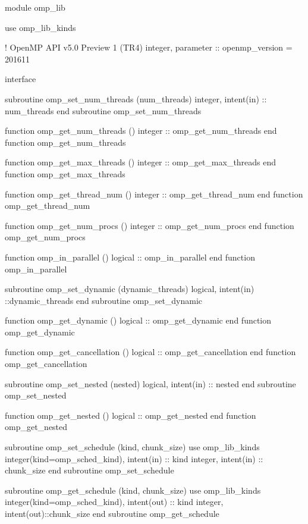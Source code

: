 {\begin{codepar}
        module omp\_lib

          use omp\_lib\_kinds

!                                     OpenMP API v5.0 Preview 1 (TR4)
          integer, parameter :: openmp\_version = 201611

         interface

          subroutine omp\_set\_num\_threads (num\_threads)
           integer, intent(in) :: num\_threads
          end subroutine omp\_set\_num\_threads

          function omp\_get\_num\_threads ()
           integer :: omp\_get\_num\_threads
          end function omp\_get\_num\_threads

          function omp\_get\_max\_threads ()
           integer :: omp\_get\_max\_threads
          end function omp\_get\_max\_threads

          function omp\_get\_thread\_num ()
           integer :: omp\_get\_thread\_num
          end function omp\_get\_thread\_num

          function omp\_get\_num\_procs ()
           integer :: omp\_get\_num\_procs
          end function omp\_get\_num\_procs

          function omp\_in\_parallel ()
           logical :: omp\_in\_parallel
          end function omp\_in\_parallel

          subroutine omp\_set\_dynamic (dynamic\_threads)
           logical, intent(in) ::dynamic\_threads
          end subroutine omp\_set\_dynamic

          function omp\_get\_dynamic ()
           logical :: omp\_get\_dynamic
          end function omp\_get\_dynamic

          function omp\_get\_cancellation ()
           logical :: omp\_get\_cancellation
          end function omp\_get\_cancellation

          subroutine omp\_set\_nested (nested)
           logical, intent(in) :: nested
          end subroutine omp\_set\_nested

          function omp\_get\_nested ()
           logical :: omp\_get\_nested
          end function omp\_get\_nested

          subroutine omp\_set\_schedule (kind, chunk\_size)
           use omp\_lib\_kinds
           integer(kind=omp\_sched\_kind), intent(in) :: kind
           integer, intent(in) :: chunk\_size
          end subroutine omp\_set\_schedule

          subroutine omp\_get\_schedule (kind, chunk\_size)
           use omp\_lib\_kinds
           integer(kind=omp\_sched\_kind), intent(out) :: kind
           integer, intent(out)::chunk\_size
          end subroutine omp\_get\_schedule


\end{codepar}}
